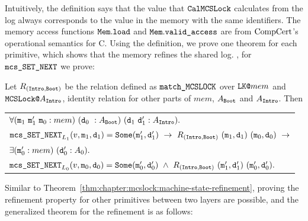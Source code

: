Intuitively, the definition says that the value that
${\mathrm{\texttt{CalMCSLock}}}$ calculates from the log always corresponds to the value 
in the memory with the same identifiers. The memory access functions ${\mathrm{\texttt{Mem}}} . {\mathrm{\texttt{load}}}$ and ${\mathrm{\texttt{Mem}}} . {\mathrm{\texttt{valid\_access}}}$ are
from $\mathrm{CompCert}$'s operational semantics for C.
Using the definition, we prove one theorem for each primitive, which
shows that the memory refines the shared log. \eg, for ${\mathrm{\texttt{mcs\_SET\_NEXT}}}$ we prove:

\begin{theorem}
    \label{thm:chapter:mcslock:machine-state-refinement} Let $R_{({\mathrm{\texttt{Intro}}}, {\mathrm{\texttt{Boot}}})}$ be the relation defined as ${\mathrm{\texttt{match\_MCSLOCK}}}$
    over ${\mathrm{\texttt{LK@}}}mem$ and ${\mathrm{\texttt{MCSLock}}}{\mathrm{\texttt{@}}}A_{{\mathrm{\texttt{Intro}}}}$, 
identity relation for other parts of $mem$, $A_{{\mathrm{\texttt{Boot}}}}$ and $A_{{\mathrm{\texttt{Intro}}}}$. Then\newline
 \begin{tabular}{P{0.95\textwidth}}
$ \forall (\codeinmath{{m}}_{1} \ \codeinmath{{m}}_{1}'\ \codeinmath{{m}}_{0} : mem)\  (\codeinmath{{d}}_{0} \ : A_{\mmcsboot})\ (\codeinmath{{d}}_{1} \ \codeinmath{{d}}_{1}' : A_{\mmcslockintro}). $ \\
$ \mcssetnext_{L_1}(v, \codeinmath{{m}}_1, \codeinmath{{d}}_1) = \Some (\codeinmath{{m}}'_1, \codeinmath{{d}}'_1) \ \rightarrow \
  R_{(\mmcslockintro, \mmcsboot)}\ (\codeinmath{{m}}_1, \codeinmath{{d}}_1)\ (\codeinmath{{m}}_0, \codeinmath{{d}}_0) \ \rightarrow $\\
  $ \exists ({\mathrm{\texttt{{m}}}}_{0}' : mem)\ ({\mathrm{\texttt{{d}}}}_{0}' : A_0).$ \\
  $  \mcssetnext_{L_0}(v, \codeinmath{{m}}_0, \codeinmath{{d}}_0) = \Some(\codeinmath{{m}}'_0, \codeinmath{{d}}'_0) \ \wedge \
  R_{(\mmcslockintro, \mmcsboot)}\ (\codeinmath{{m}}'_1, \codeinmath{{d}}'_1)\ (\codeinmath{{m}}'_0, \codeinmath{{d}}'_0).$ 
   \end{tabular}
\end{theorem}
Similar to  Theorem~\ref{thm:chapter:mcslock:machine-state-refinement},
proving the refinement property for other primitives between two layers 
are possible, and the generalized theorem for the refinement is as follows:

